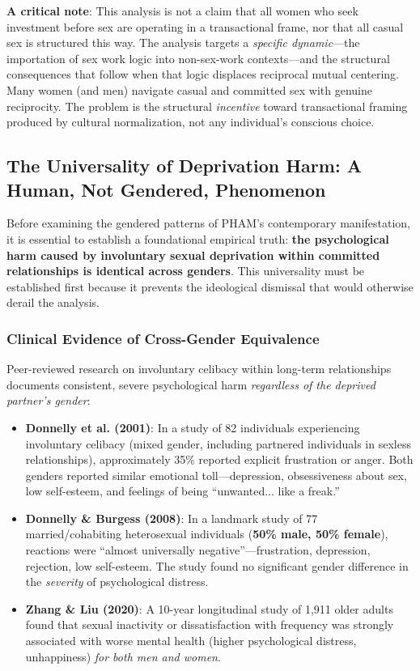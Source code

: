 \documentclass[12pt, letterpaper]{article}
\begin{document}
\textbf{A critical note}: This analysis is not a claim that all women who seek investment before sex are operating in a transactional frame, nor that all casual sex is structured this way. The analysis targets a \textit{specific dynamic}---the importation of sex work logic into non-sex-work contexts---and the structural consequences that follow when that logic displaces reciprocal mutual centering. Many women (and men) navigate casual and committed sex with genuine reciprocity. The problem is the structural \textit{incentive} toward transactional framing produced by cultural normalization, not any individual's conscious choice.

\subsection{The Universality of Deprivation Harm: A Human, Not Gendered, Phenomenon}

Before examining the gendered patterns of PHAM's contemporary manifestation, it is essential to establish a foundational empirical truth: \textbf{the psychological harm caused by involuntary sexual deprivation within committed relationships is identical across genders}. This universality must be established first because it prevents the ideological dismissal that would otherwise derail the analysis.

\subsubsection{Clinical Evidence of Cross-Gender Equivalence}

Peer-reviewed research on involuntary celibacy within long-term relationships documents consistent, severe psychological harm \textit{regardless of the deprived partner's gender}:

\begin{itemize}
    \item \textbf{Donnelly et al. (2001)}: In a study of 82 individuals experiencing involuntary celibacy (mixed gender, including partnered individuals in sexless relationships), approximately 35\% reported explicit frustration or anger. Both genders reported similar emotional toll---depression, obsessiveness about sex, low self-esteem, and feelings of being ``unwanted... like a freak.''
    
    \item \textbf{Donnelly \& Burgess (2008)}: In a landmark study of 77 married/cohabiting heterosexual individuals (\textbf{50\% male, 50\% female}), reactions were ``almost universally negative''---frustration, depression, rejection, low self-esteem. The study found no significant gender difference in the \textit{severity} of psychological distress.
    
    \item \textbf{Zhang \& Liu (2020)}: A 10-year longitudinal study of 1,911 older adults found that sexual inactivity or dissatisfaction with frequency was strongly associated with worse mental health (higher psychological distress, unhappiness) \textit{for both men and women}.
\end{itemize}
\end{document}
